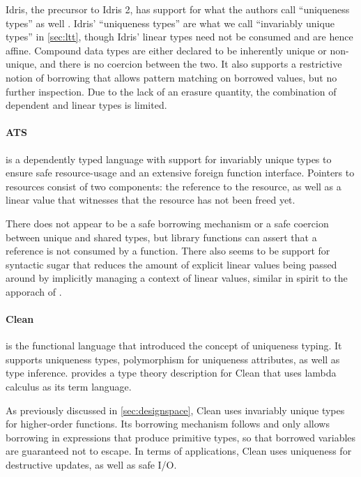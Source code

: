 Idris, the precursor to Idris 2, has support for what the authors call ``uniqueness types'' as well \citep{brady_type_2017}. Idris' ``uniqueness types'' are what we call ``invariably unique types'' in \cref{sec:ltt}, though Idris' linear types need not be consumed and are hence affine. Compound data types are either declared to be inherently unique or non-unique, and there is no coercion between the two. It also supports a restrictive notion of borrowing that allows pattern matching on borrowed values, but no further inspection. Due to the lack of an erasure quantity, the combination of dependent and linear types is limited.

\paragraph{ATS \citep{shi_linear_2013}} is a dependently typed language with support for invariably unique types to ensure safe resource-usage and an extensive foreign function interface. Pointers to resources consist of two components: the reference to the resource, as well as a linear value that witnesses that the resource has not been freed yet. 

There does not appear to be a safe borrowing mechanism or a safe coercion between unique and shared types, but library functions can assert that a reference is not consumed by a function. There also seems to be support for syntactic sugar that reduces the amount of explicit linear values being passed around by implicitly managing a context of linear values, similar in spirit to the apporach of \cite{spiwack_linearly_2022}.

\paragraph{Clean \citep{smetsers_guaranteeing_1994}} is the functional language that introduced the concept of uniqueness typing. It supports uniqueness types, polymorphism for uniqueness attributes, as well as type inference. \cite{de_vries_making_2009} provides a type theory description for Clean that uses lambda calculus as its term language. 

As previously discussed in \cref{sec:designspace}, Clean uses invariably unique types for higher-order functions. Its borrowing mechanism follows \cite{wadler_linear_1990} and only allows borrowing in expressions that produce primitive types, so that borrowed variables are guaranteed not to escape. In terms of applications, Clean uses uniqueness for destructive updates, as well as safe I/O.

